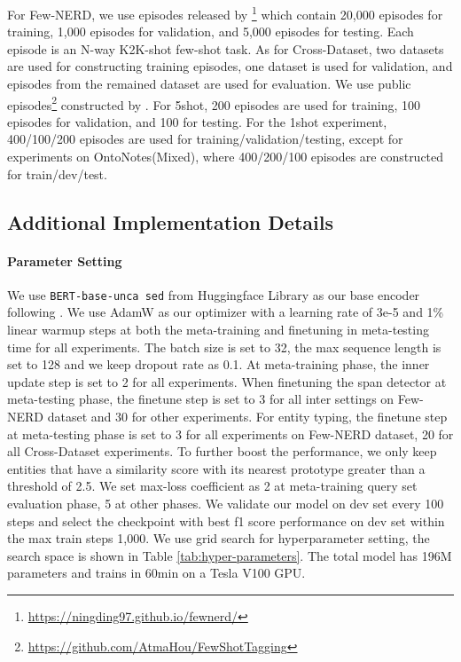 \documentclass[11pt]{article}
\begin{document}
For Few-NERD, we use episodes released by \citet{ding2021nerd}\footnote{\url{https://ningding97.github.io/fewnerd/}} which contain 20,000 episodes for training, 1,000 episodes for validation, and 5,000 episodes for testing. Each episode is an N-way K2K-shot few-shot task. As for Cross-Dataset, 
two datasets are used for constructing training episodes, one dataset is used for validation, and episodes from the remained dataset are used for evaluation. We use public episodes\footnote{\url{https://github.com/AtmaHou/FewShotTagging}} constructed by \citet{hou2020few}. For 5shot, 200 episodes are used for training, 100 episodes for validation, and 100 for testing. For the 1shot experiment, 400/100/200 episodes are used for training/validation/testing, except for experiments on OntoNotes(Mixed), where 400/200/100 episodes are constructed for train/dev/test. 


\subsection{Additional Implementation Details}
\label{sec:details}
\paragraph{Parameter Setting}

We use \texttt{BERT-base-unca sed} from Huggingface Library \citep{wolf2020transformers} as our base encoder following \citet{ding2021nerd}. We use AdamW \citep{loshchilov2018decoupled} as our optimizer with a learning rate of 3e-5 and 1\% linear warmup steps at both the meta-training and finetuning in meta-testing time for all experiments. The batch size is set to 32, the max sequence length is set to 128 and we keep dropout rate as 0.1. At meta-training phase, the inner update step is set to 2 for all experiments. When finetuning the span detector at meta-testing phase, the finetune step is set to 3 for all inter settings on Few-NERD dataset and 30 for other experiments. For entity typing, the finetune step at meta-testing phase is set to 3 for all experiments on Few-NERD dataset, 20 for all Cross-Dataset experiments. To further boost the performance, we only keep entities that have a similarity score with its nearest prototype greater than a threshold of 2.5. We set max-loss coefficient  as 2 at meta-training query set evaluation phase, 5 at other phases. We validate our model on dev set every 100 steps and select the checkpoint with best f1 score performance on dev set within the max train steps 1,000. We use grid search for hyperparameter setting, the search space is shown in Table \ref{tab:hyper-parameters}. The total model has 196M parameters and trains in 60min on a Tesla V100 GPU.
\end{document}
